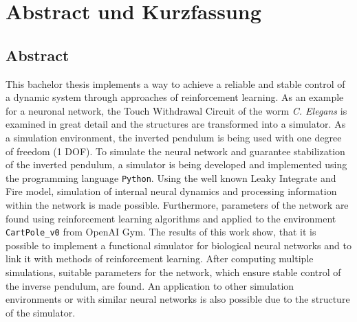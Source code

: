 %
\chapter*{Abstract und Kurzfassung}
%

%
\section*{Abstract}
%
This bachelor thesis implements a way to achieve a reliable and stable control of a dynamic system through approaches of reinforcement learning. As an example for a neuronal network, the \glqq Touch Withdrawal Circuit\grqq{} of the worm \textit{C. Elegans} is examined in great detail and the structures are transformed into a simulator. As a simulation environment, the inverted pendulum is being used with one degree of freedom (1 DOF). To simulate the neural network and guarantee stabilization of the inverted pendulum, a simulator is being developed and implemented using the programming language \texttt{Python}. Using the well known Leaky Integrate and Fire model, simulation of internal neural dynamics and processing information within the network is made possible. Furthermore, parameters of the network are found using reinforcement learning algorithms and applied to the environment \texttt{CartPole\_v0} from OpenAI Gym. The results of this work show, that it is possible to implement a functional simulator for biological neural networks and to link it with methods of reinforcement learning. After computing multiple simulations, suitable parameters for the network, which ensure stable control of the inverse pendulum, are found. An application to other simulation environments or with similar neural networks is also possible due to the structure of the simulator.


%
